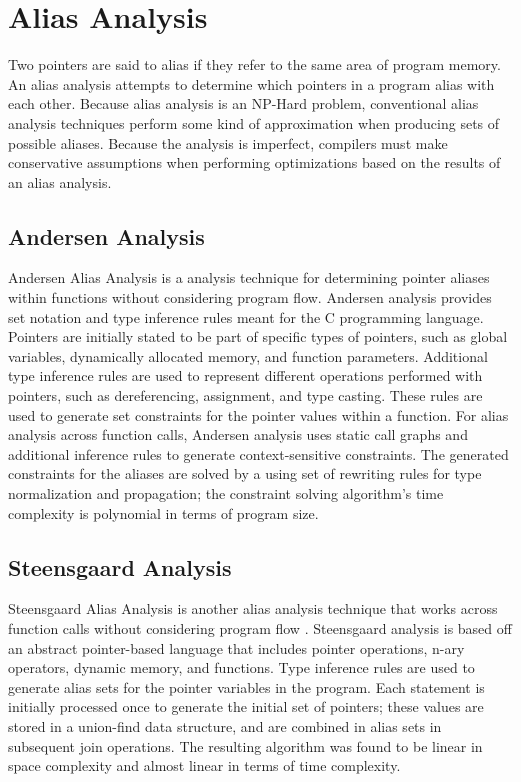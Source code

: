 \section{Alias Analysis}
Two pointers are said to alias if they refer to the same area of program memory. An alias analysis attempts to determine which pointers in a program alias with each other. Because alias analysis is an NP-Hard problem, conventional alias analysis techniques perform some kind of approximation when producing sets of possible aliases. Because the analysis is imperfect, compilers must make conservative assumptions when performing optimizations based on the results of an alias analysis.

\subsection{Andersen Analysis}
Andersen Alias Analysis is a analysis technique for determining pointer aliases within functions without considering program flow. Andersen analysis provides set notation and type inference rules meant for the C programming language. Pointers are initially stated to be part of specific types of pointers, such as global variables, dynamically allocated memory, and function parameters. Additional type inference rules are used to represent different operations performed with pointers, such as dereferencing, assignment, and type casting. These rules are used to generate set constraints for the pointer values within a function. For alias analysis across function calls, Andersen analysis uses static call graphs and additional inference rules to generate context-sensitive constraints. The generated constraints for the aliases are solved by a using set of rewriting rules for type normalization and propagation; the constraint solving algorithm's time complexity is polynomial in terms of program size.

\subsection{Steensgaard Analysis}
Steensgaard Alias Analysis is another alias analysis technique that works across function calls without considering program flow \cite{Steensgaard}. Steensgaard analysis is based off an abstract pointer-based language that includes pointer operations, n-ary operators, dynamic memory, and functions. Type inference rules are used to generate alias sets for the pointer variables in the program. Each statement is initially processed once to generate the initial set of pointers; these values are stored in a union-find data structure, and are combined in alias sets in subsequent join operations. The resulting algorithm was found to be linear in space complexity and almost linear in terms of time complexity.
